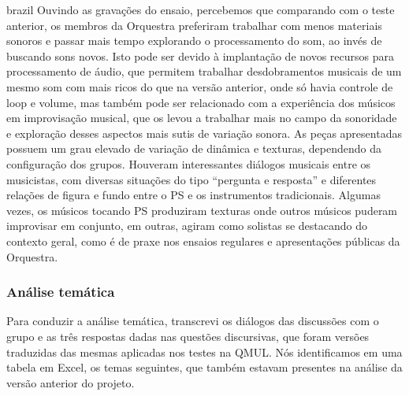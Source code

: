 \begin{otherlanguage*}{brazil}
Ouvindo as gravações do ensaio, percebemos que comparando com o teste anterior, os membros da Orquestra preferiram trabalhar com menos materiais sonoros e passar mais tempo explorando o processamento do som, ao invés de buscando sons novos. Isto pode ser devido à implantação de novos recursos para processamento de áudio, que permitem trabalhar desdobramentos musicais de um mesmo som com mais ricos do que na versão anterior, onde só havia controle de loop e volume, mas também pode ser relacionado com a experiência dos músicos em improvisação musical, que os levou a trabalhar mais no campo da sonoridade e exploração desses aspectos mais sutis de variação sonora. As peças apresentadas possuem um grau elevado de variação de dinâmica e texturas, dependendo da configuração dos grupos. Houveram interessantes diálogos musicais entre os musicistas, com diversas situações do tipo ``pergunta e resposta'' e diferentes relações de figura e fundo entre o PS e os instrumentos tradicionais. Algumas vezes, os músicos tocando PS produziram texturas onde outros músicos puderam improvisar em conjunto, em outras, agiram como solistas se destacando do contexto geral, como é de praxe nos ensaios regulares e apresentações públicas da Orquestra. 





\subsubsection{Análise temática}
Para conduzir a análise temática\cite{Braun2006}, transcrevi os diálogos das discussões com o grupo e as três respostas dadas nas questões discursivas, que foram versões traduzidas das mesmas aplicadas nos testes na QMUL. Nós identificamos em uma tabela em Excel, os temas seguintes, que também estavam presentes na análise da versão anterior do projeto\cite{Stolfi2018b}.


\end{otherlanguage*}

